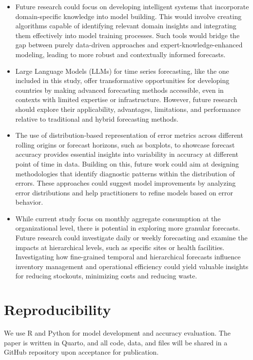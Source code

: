 \documentclass[
  authoryear,
  preprint,
  3p]{elsarticle}
\begin{document}
\begin{itemize}
\item
  Future research could focus on developing intelligent systems that
  incorporate domain-specific knowledge into model building. This would
  involve creating algorithms capable of identifying relevant domain
  insights and integrating them effectively into model training
  processes. Such tools would bridge the gap between purely data-driven
  approaches and expert-knowledge-enhanced modeling, leading to more
  robust and contextually informed forecasts.
\item
  Large Language Models (LLMs) for time series forecasting, like the one
  included in this study, offer transformative opportunities for
  developing countries by making advanced forecasting methods
  accessible, even in contexts with limited expertise or infrastructure.
  However, future research should explore their applicability,
  advantages, limitations, and performance relative to traditional and
  hybrid forecasting methods.
\item
  The use of distribution-based representation of error metrics across
  different rolling origins or forecast horizons, such as boxplots, to
  showcase forecast accuracy provides essential insights into
  variability in accuracy at different point of time in data. Building
  on this, future work could aim at designing methodologies that
  identify diagnostic patterns within the distribution of errors. These
  approaches could suggest model improvements by analyzing error
  distributions and help practitioners to refine models based on error
  behavior.
\item
  While current study focus on monthly aggregate consumption at the
  organizational level, there is potential in exploring more granular
  forecasts. Future research could investigate daily or weekly
  forecasting and examine the impacts at hierarchical levels, such as
  specific sites or health facilities. Investigating how fine-grained
  temporal and hierarchical forecasts influence inventory management and
  operational efficiency could yield valuable insights for reducing
  stockouts, minimizing costs and reducing waste.
\end{itemize}

\section*{Reproducibility}\label{reproducibility}

We use R and Python for model development and accuracy evaluation. The
paper is written in Quarto, and all code, data, and files will be shared
in a GitHub repository upon acceptance for publication.


\renewcommand\refname{References}
  
\end{document}

